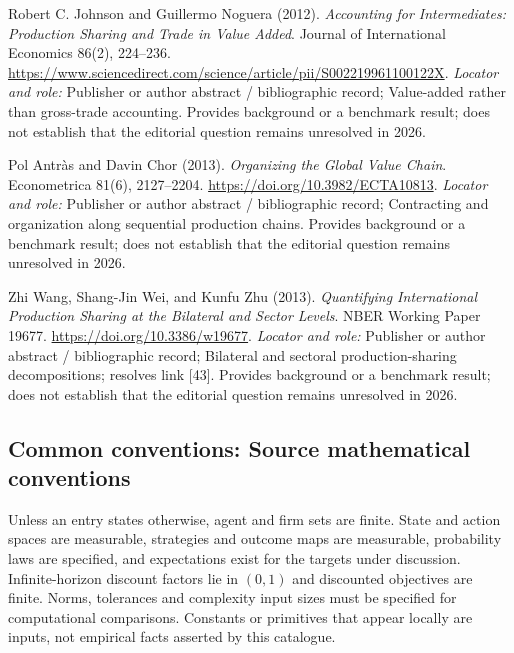 \documentclass[11pt,a4paper]{article}
\begin{document}
\begin{enumerate}[label={[S\arabic*]},leftmargin=*]

\item Robert C. Johnson and Guillermo Noguera (2012). \emph{Accounting for Intermediates: Production Sharing and Trade in Value Added}. Journal of International Economics 86(2), 224–236. \url{https://www.sciencedirect.com/science/article/pii/S002219961100122X}.
\textit{Locator and role:} Publisher or author abstract / bibliographic record; Value-added rather than gross-trade accounting. Provides background or a benchmark result; does not establish that the editorial question remains unresolved in 2026.

\item Pol Antràs and Davin Chor (2013). \emph{Organizing the Global Value Chain}. Econometrica 81(6), 2127–2204. \url{https://doi.org/10.3982/ECTA10813}.
\textit{Locator and role:} Publisher or author abstract / bibliographic record; Contracting and organization along sequential production chains. Provides background or a benchmark result; does not establish that the editorial question remains unresolved in 2026.

\item Zhi Wang, Shang-Jin Wei, and Kunfu Zhu (2013). \emph{Quantifying International Production Sharing at the Bilateral and Sector Levels}. NBER Working Paper 19677. \url{https://doi.org/10.3386/w19677}.
\textit{Locator and role:} Publisher or author abstract / bibliographic record; Bilateral and sectoral production-sharing decompositions; resolves link [43]. Provides background or a benchmark result; does not establish that the editorial question remains unresolved in 2026.

\end{enumerate}

\subsection*{Common conventions: Source mathematical conventions}

Unless an entry states otherwise, agent and firm sets are finite. State and action spaces are measurable, strategies and outcome maps are measurable, probability laws are specified, and expectations exist for the targets under discussion. Infinite-horizon discount factors lie in $(0,1)$ and discounted objectives are finite. Norms, tolerances and complexity input sizes must be specified for computational comparisons. Constants or primitives that appear locally are inputs, not empirical facts asserted by this catalogue.
\end{document}
